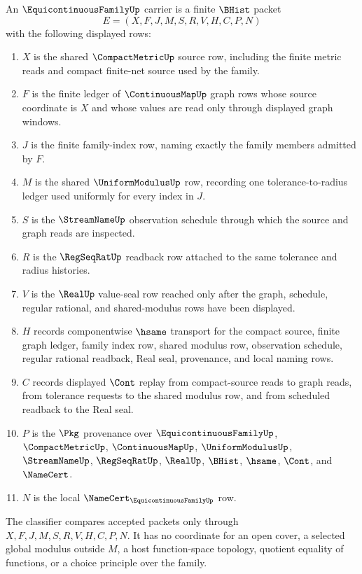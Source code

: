 \begin{definition}
\label{def:equicontinuous-family-carrier}
An $\EquicontinuousFamilyUp$ carrier is a finite $\BHist$ packet
$$
E=(X,F,J,M,S,R,V,H,C,P,N)
$$
with the following displayed rows:
\begin{enumerate}
\item $X$ is the shared $\CompactMetricUp$ source row, including the finite metric reads and compact finite-net source used by the family.
\item $F$ is the finite ledger of $\ContinuousMapUp$ graph rows whose source coordinate is $X$ and whose values are read only through displayed graph windows.
\item $J$ is the finite family-index row, naming exactly the family members admitted by $F$.
\item $M$ is the shared $\UniformModulusUp$ row, recording one tolerance-to-radius ledger used uniformly for every index in $J$.
\item $S$ is the $\StreamNameUp$ observation schedule through which the source and graph reads are inspected.
\item $R$ is the $\RegSeqRatUp$ readback row attached to the same tolerance and radius histories.
\item $V$ is the $\RealUp$ value-seal row reached only after the graph, schedule, regular rational, and shared-modulus rows have been displayed.
\item $H$ records componentwise $\hsame$ transport for the compact source, finite graph ledger, family index row, shared modulus row, observation schedule, regular rational readback, Real seal, provenance, and local naming rows.
\item $C$ records displayed $\Cont$ replay from compact-source reads to graph reads, from tolerance requests to the shared modulus row, and from scheduled readback to the Real seal.
\item $P$ is the $\Pkg$ provenance over $\EquicontinuousFamilyUp$, $\CompactMetricUp$, $\ContinuousMapUp$, $\UniformModulusUp$, $\StreamNameUp$, $\RegSeqRatUp$, $\RealUp$, $\BHist$, $\hsame$, $\Cont$, and $\NameCert$.
\item $N$ is the local $\NameCert_{\EquicontinuousFamilyUp}$ row.
\end{enumerate}
The classifier compares accepted packets only through $X,F,J,M,S,R,V,H,C,P,N$. It has no coordinate for an open cover, a selected global modulus outside $M$, a host function-space topology, quotient equality of functions, or a choice principle over the family.
\end{definition}

